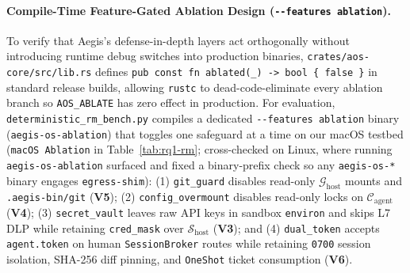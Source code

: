 \documentclass[10pt,twocolumn]{article}
\begin{document}
\paragraph{Compile-Time Feature-Gated Ablation Design (\texttt{-\/-features ablation}).}
To verify that Aegis's defense-in-depth layers act orthogonally without introducing runtime debug switches into production binaries, \texttt{crates/aos-core/src/lib.rs} defines \texttt{pub const fn ablated(\_) -> bool \{ false \}} in standard release builds, allowing \texttt{rustc} to dead-code-eliminate every ablation branch so \texttt{AOS\_ABLATE} has zero effect in production. For evaluation, \texttt{deterministic\_rm\_bench.py} compiles a dedicated \texttt{-\/-features ablation} binary (\texttt{aegis-os-ablation}) that toggles one safeguard at a time on our macOS testbed (\texttt{macOS Ablation} in Table~\ref{tab:rq1-rm}; cross-checked on Linux, where running \texttt{aegis-os-ablation} surfaced and fixed a binary-prefix check so any \texttt{aegis-os-*} binary engages \texttt{egress-shim}): (1) \texttt{git\_guard} disables read-only $\mathcal{G}_{\text{host}}$ mounts and \texttt{.aegis-bin/git} (\textbf{V5}); (2) \texttt{config\_overmount} disables read-only locks on $\mathcal{C}_{\text{agent}}$ (\textbf{V4}); (3) \texttt{secret\_vault} leaves raw API keys in sandbox \texttt{environ} and skips L7 DLP while retaining \texttt{cred\_mask} over $\mathcal{S}_{\text{host}}$ (\textbf{V3}); and (4) \texttt{dual\_token} accepts \texttt{agent.token} on human \texttt{SessionBroker} routes while retaining \texttt{0700} session isolation, SHA-256 diff pinning, and \texttt{OneShot} ticket consumption (\textbf{V6}).
\end{document}
